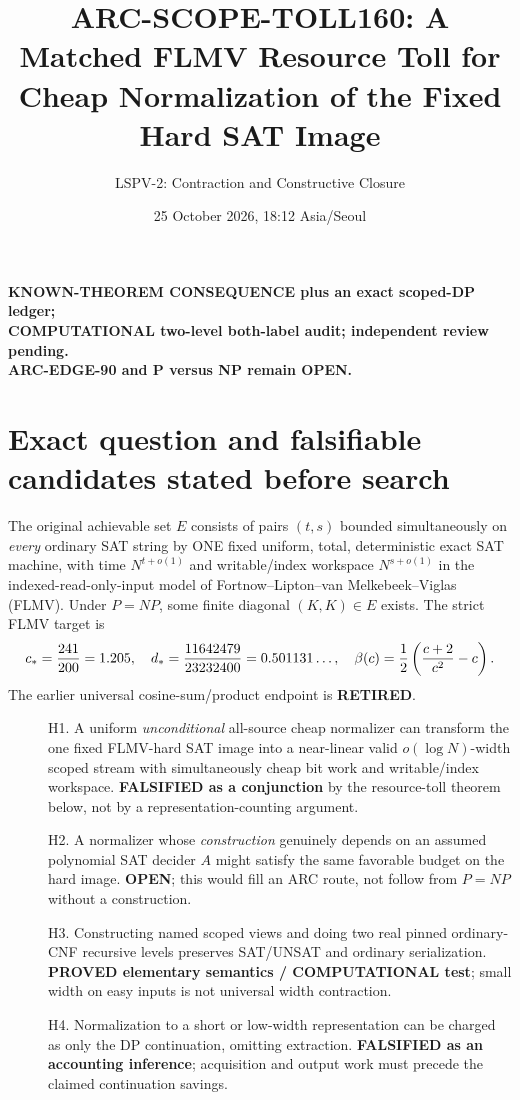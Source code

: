 \documentclass[11pt]{article}
\title{ARC-SCOPE-TOLL160: A Matched FLMV Resource Toll for\\
Cheap Normalization of the Fixed Hard SAT Image}
\author{LSPV-2: Contraction and Constructive Closure}
\date{25 October 2026, 18:12 Asia/Seoul}
\begin{document}
\maketitle
\begin{center}
\textbf{KNOWN-THEOREM CONSEQUENCE plus an exact scoped-DP ledger;}\\
\textbf{COMPUTATIONAL two-level both-label audit; independent review pending.}\\
\textbf{ARC-EDGE-90 and P versus NP remain OPEN.}
\end{center}

\section{Exact question and falsifiable candidates stated before search}
The original achievable set $E$ consists of pairs $(t,s)$ bounded simultaneously on
\emph{every} ordinary SAT string by ONE fixed uniform, total, deterministic
exact SAT machine, with time $N^{t+o(1)}$ and writable/index workspace
$N^{s+o(1)}$ in the indexed-read-only-input model of
Fortnow--Lipton--van Melkebeek--Viglas (FLMV).
Under $P=NP$, some finite diagonal $(K,K)\in E$ exists.
The strict FLMV target is
\[
 c_*={241\over200}=1.205,\quad
 d_*={11642479\over23232400}=0.501131\ldots,\quad
 \beta(c)=\frac12\left(\frac{c+2}{c^2}-c\right).
\]
The earlier universal cosine-sum/product endpoint is \textbf{RETIRED}.

\begin{description}
\item[] H1. A uniform \emph{unconditional} all-source cheap normalizer can
transform the one fixed FLMV-hard SAT image into a near-linear valid
$o(\log N)$-width scoped stream with simultaneously cheap bit work and
writable/index workspace. \textbf{FALSIFIED as a conjunction} by the
resource-toll theorem below, not by a representation-counting argument.
\item[] H2. A normalizer whose \emph{construction} genuinely depends on an
assumed polynomial SAT decider $A$ might satisfy the same favorable budget
on the hard image. \textbf{OPEN}; this would fill an ARC route, not
follow from $P=NP$ without a construction.
\item[] H3. Constructing named scoped views and doing two real pinned
ordinary-CNF recursive levels preserves SAT/UNSAT and ordinary
serialization. \textbf{PROVED elementary semantics / COMPUTATIONAL test};
small width on easy inputs is not universal width contraction.
\item[] H4. Normalization to a short or low-width representation can be
charged as only the DP continuation, omitting extraction. \textbf{FALSIFIED
as an accounting inference}; acquisition and output work must precede
the claimed continuation savings.
\end{description}
\end{document}
